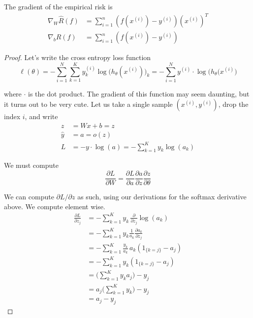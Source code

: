   \begin{theorem}
    The gradient of the empirical risk is 
    \begin{align}
      \nabla_W \hat{R}(f) & = \sum_{i=1}^n (f(x^{(i)}) - y^{(i)}) (x^{(i)})^T \\ 
      \nabla_b \hat{R}(f) & = \sum_{i=1}^n (f(x^{(i)}) - y^{(i)})
    \end{align}
  \end{theorem}
  \begin{proof}
    Let's write the cross entropy loss function 
    \begin{equation}
      \ell (\theta) = - \sum_{i=1}^N \sum_{k=1}^K y^{(i)}_k \log \big( h_{\theta} (x^{(i)})\big)_k = - \sum_{i=1}^N y^{(i)} \cdot \log \big( h_{\theta} (x^{(i)} \big)
    \end{equation}
   
    where $\cdot$ is the dot product. The gradient of this function may seem daunting, but it turns out to be very cute. Let us take a single sample $(x^{(i)}, y^{(i)})$, drop the index $i$, and write
    \begin{align}
      z & = W x + b = z \\
      \hat{y} & = a = o (z) \\
      L & = - y \cdot \log (a) = - \sum_{k=1}^K y_k \log(a_k)
    \end{align}
   
    We must compute 
    \begin{equation}
      \frac{\partial L}{\partial W} = \frac{\partial L}{\partial a} \frac{\partial a}{\partial z} \frac{\partial z}{\partial \theta}
    \end{equation}
   
    We can compute $\partial L /\partial z$ as such, using our derivations for the softmax derivative above. We compute element wise. 
    \begin{align}
      \frac{\partial L}{\partial z_j} & = - \sum_{k=1}^K y_k \, \frac{\partial}{\partial z_j} \log (a_k) \\
      & = - \sum_{k=1}^K y_k \frac{1}{a_k} \frac{\partial a_k}{\partial z_j} \\
      & = - \sum_{k=1}^K \frac{y_k}{a_k} \, a_k (1_{\{k = j\}} - a_j) \\
      & = - \sum_{k=1}^K y_k (1_{\{k = j\}} - a_j) \\
      & = \bigg( \sum_{k=1}^K y_k a_j \bigg) - y_j \\
      & = a_j \bigg( \sum_{k=1}^K y_k \bigg) - y_j \\
      & = a_j - y_j
    \end{align}
   

\end{proof}

